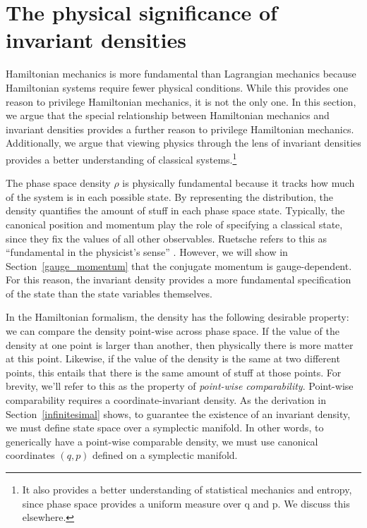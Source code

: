 \documentclass[12pt, english, twoside]{article} %
\begin{document}
\section{The physical significance of invariant densities}
\label{density}

Hamiltonian mechanics is more fundamental than Lagrangian mechanics because Hamiltonian systems require fewer physical conditions. While this provides one reason to privilege Hamiltonian mechanics, it is not the only one. In this section, we argue that the special relationship between Hamiltonian mechanics and invariant densities provides a further reason to privilege Hamiltonian mechanics. Additionally, we argue that viewing physics through the lens of invariant densities provides a better understanding of classical systems.\footnote{It also provides a better understanding of statistical mechanics and entropy, since phase space provides a uniform measure over q and p. We discuss this elsewhere.}

The phase space density $\rho$ is physically fundamental because it tracks how much of the system is in each possible state. By representing the distribution, the density quantifies the amount of stuff in each phase space state. Typically, the canonical position and momentum play the role of specifying a classical state, since they fix the values of all other observables. Ruetsche refers to this as ``fundamental in the physicist's sense'' \parencite*[31, 200]{Ruetsche}. However, we will show in Section~\ref{gauge_momentum} that the conjugate momentum is gauge-dependent. For this reason, the invariant density provides a more fundamental specification of the state than the state variables themselves.

In the Hamiltonian formalism, the density has the following desirable property: we can compare the density point-wise across phase space. If the value of the density at one point is larger than another, then physically there is more matter at this point. Likewise, if the value of the density is the same at two different points, this entails that there is the same amount of stuff at those points. For brevity, we'll refer to this as the property of \textit{point-wise comparability}. Point-wise comparability requires a coordinate-invariant density. As the derivation in Section~\ref{infinitesimal} shows, to guarantee the existence of an invariant density, we must define state space over a symplectic manifold. In other words, to generically have a point-wise comparable density, we must use canonical coordinates $(q, p)$ defined on a symplectic manifold. 
\end{document}
